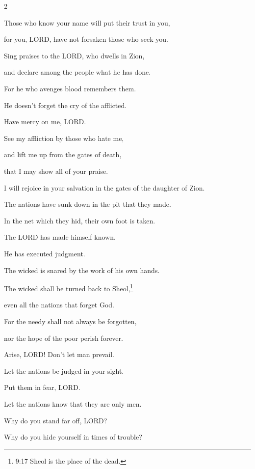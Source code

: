 \begin{multicols}{2}
	
	\myverse{}Those who know your name will put their trust in you,
	
	for you, LORD, have not forsaken those who seek you.
	
	
	\myverse{}Sing praises to the LORD, who dwells in Zion,
	
	and declare among the people what he has done.
	
	
	\myverse{}For he who avenges blood remembers them.
	
	He doesn’t forget the cry of the afflicted.
	
	
	\myverse{}Have mercy on me, LORD.
	
	See my affliction by those who hate me,
	
	and lift me up from the gates of death,
	
	
	\myverse{}that I may show all of your praise.
	
	I will rejoice in your salvation in the gates of the daughter of Zion.
	
	
	\myverse{}The nations have sunk down in the pit that they made.
	
	In the net which they hid, their own foot is taken.
	
	
	\myverse{}The LORD has made himself known.
	
	He has executed judgment.
	
	The wicked is snared by the work of his own hands.
	
	
	\vspace{\baselineskip}	
	
	\myverse{}The wicked shall be turned back to Sheol,\footnote{9:17 Sheol is the place of the dead.}
	
	even all the nations that forget God.
	
	
	\myverse{}For the needy shall not always be forgotten,
	
	nor the hope of the poor perish forever.
	
	
	\myverse{}Arise, LORD! Don’t let man prevail.
	
	Let the nations be judged in your sight.
	
	
	\myverse{}Put them in fear, LORD.
	
	Let the nations know that they are only men.
	
	
	
	\mychapter{} \myverse*{}Why do you stand far off, LORD?
	
	\quad\quad Why do you hide yourself in times of trouble?
	

\end{multicols}
